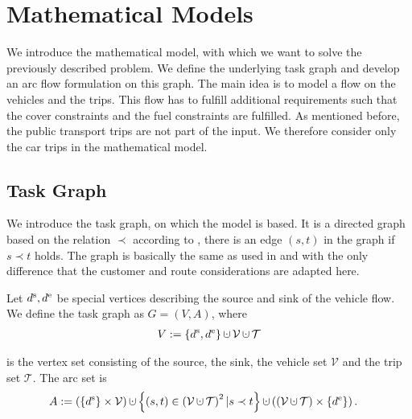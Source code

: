 \chapter{Mathematical Models}
\label{ch:mathematical_models}

We introduce the mathematical model, with which we want to solve the previously described problem. We define the underlying task graph and develop an arc flow formulation on this graph. The main idea is to model a flow on the vehicles and the trips. This flow has to fulfill additional requirements such that the cover constraints and the fuel constraints are fulfilled. As mentioned before, the public transport trips are not part of the input. We therefore consider only the car trips in the mathematical model.

\section{Task Graph}

We introduce the task graph, on which the model is based. It is a directed graph based on the relation $\prec$ according to , \ie there is an edge $(s,t)$ in the graph if $s\prec t$ holds. The graph is basically the same as used in \cite{Kaiser} and \cite{Knoll} with the only difference that the customer and route considerations are adapted here.

\begin{definition}
\label{def:taskgraph}

Let $d^{\operatorname{s}},d^{\operatorname{e}}$ be special vertices describing the source and sink of the vehicle flow. We define the task graph as $G=(V,A)$, where
\begin{align*}
	V:=\left\{\ds,\de\right\}\cupdot\mathcal{V}\cupdot\mathcal{T}
\end{align*}

is the vertex set consisting of the source, the sink, the vehicle set $\mathcal{V}$ and the trip set $\mathcal{T}$. The arc set is
\begin{align*}
	A & :=\left(\left\{\ds\right\}\times\mathcal{V}\right)\cupdot\left\{(s,t)\in\left(\mathcal{V}\cupdot\mathcal{T}\right)^2|s\prec t\right\}\cupdot\left(\left(\mathcal{V}\cupdot\mathcal{T}\right)\times\left\{\de\right\}\right).
\end{align*}

\end{definition}

